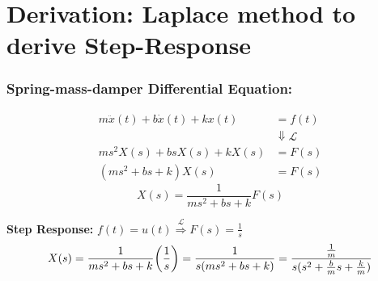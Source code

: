 \documentclass[aspectratio=169,handout]{beamer}
\begin{document}
\section{Derivation: Laplace method to derive Step-Response}
\begin{frame}
	\frametitle{Spring-mass-damper Differential Equation:}
	\begin{align*}
		m \ddot{x}(t) + b \dot{x}(t) + k x(t) &= f(t)\\
		&\Downarrow \mathcal{L}\\
		m s^2 X(s) + b s X(s) + k X(s) &= F(s)\\
		(m s^2 + bs + k) X(s) &= F(s)
	\end{align*}
	\[
		X(s) = \frac{1}{ms^2 + b s + k} F(s)
	\]

	\textbf{Step Response:}
	$f(t) = u(t) \overset{\mathcal{L}}{\Rightarrow} F(s) = \frac{1}{s}$
	\[
		X(s) = \frac{1}{ms^2 + b s + k} \qty(\frac{1}{s})
		= \frac{1}{s(m s^2 + b s + k)}
		= \frac{\frac{1}{m}}{s (s^2 + \frac{b}{m}s + \frac{k}{m})}
	\]
		
\end{frame}
\end{document}
